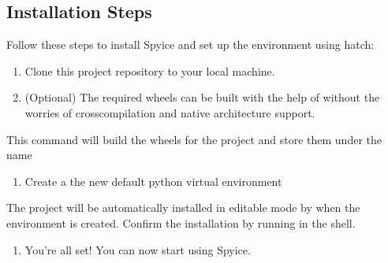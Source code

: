 \documentclass[a4paper,11pt,english,openany]{sphinxmanual}
\begin{document}
\subsection{Installation Steps}
\label{\detokenize{quick_start/installation:installation-steps}}
\sphinxAtStartPar
Follow these steps to install Spyice and set up the environment using hatch:
\begin{enumerate}
%
\item {} 
\sphinxAtStartPar
Clone this project repository to your local machine.

\item {} 
\sphinxAtStartPar
(Optional) The required wheels can be built with the help of  without the worries of cross\sphinxhyphen{}compilation and native architecture support.
\begin{quote}

\sphinxAtStartPar
{}
\end{quote}

\end{enumerate}

\sphinxAtStartPar
This command will build the wheels for the project and store them under the name 
\begin{enumerate}
%
\setcounter{enumi}{2}
\item {} 
\sphinxAtStartPar
Create a the new default python virtual environment
\begin{quote}

\sphinxAtStartPar
{}
\end{quote}

\end{enumerate}

\sphinxAtStartPar
The project will be automatically installed in editable mode by  when the environment is created. Confirm the installation by running  in the shell.
\begin{enumerate}
%
\setcounter{enumi}{3}
\item {} 
\sphinxAtStartPar
You’re all set! You can now start using Spyice.

\end{enumerate}
\end{document}
